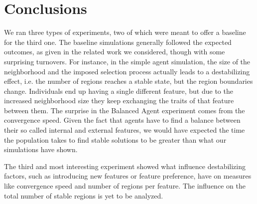 \documentclass[twoside, 11pt, a4paper]{article}
\begin{document}
\section{Conclusions}

We ran three types of experiments, two of which were meant to offer a baseline for the third one. The baseline simulations generally followed the expected outcomes, as given in the related work we considered, though with some surprising turnovers. For instance, in the simple agent simulation, the size of the neighborhood and the imposed selection process actually leads to a destabilizing effect, i.e. the number of regions reaches a stable state, but the region boundaries change. Individuals end up having a single different feature, but due to the increased neighborhood size they keep exchanging the traits of that feature between them.
The surprise in the Balanced Agent experiment comes from the convergence speed. Given the fact that agents have to find a balance between their so called internal and external features, we would have expected the time the population takes to find stable solutions to be greater than what our simulations have shown.

The third and most interesting experiment showed what influence destabilizing factors, such as introducing new features or feature preference, have on measures like convergence speed and number of regions per feature. The influence on the total number of stable regions is yet to be analyzed.


\newpage
\pagebreak

\vskip 0.2in


\end{document}
